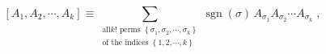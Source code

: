 \begin{equation}
\left[  A_{1},A_{2},\cdots,A_{k}\right]  \equiv\sum_{\substack{\text{all
}k!\text{\ perms }\left\{  \sigma_{1},\sigma_{2},\cdots,\sigma_{k}\right\}
\\\text{of the indices }\left\{  1,2,\cdots,k\right\}  }}\operatorname{sgn}%
\left(  \sigma\right)  \,A_{\sigma_{1}}A_{\sigma_{2}}\cdots A_{\sigma_{k}}\;,
\end{equation}

